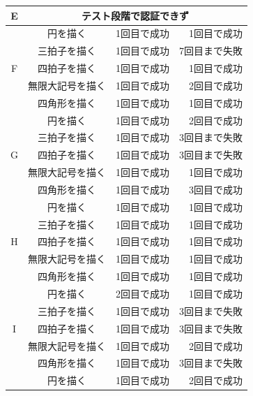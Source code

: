 \documentclass[11pt]{jreport}
\begin{document}
\begin{center}
\begin{longtable}{|c|c|r|r|}
                E & \multicolumn{3}{|c|}{テスト段階で認証できず} \\ \hline
                  & 円を描く & 1回目で成功 & 1回目で成功 \\ \cline{2-4} %
                  & 三拍子を描く & 1回目で成功 & 7回目まで失敗 \\ \cline{2-4}
                F & 四拍子を描く & 1回目で成功 & 1回目で成功 \\ \cline{2-4}
                  & 無限大記号を描く & 1回目で成功 & 2回目で成功 \\ \cline{2-4}
                  & 四角形を描く & 1回目で成功 & 1回目で成功 \\ \hline %
                  & 円を描く & 1回目で成功 & 2回目で成功 \\ \cline{2-4} %
                  & 三拍子を描く & 1回目で成功 & 3回目まで失敗 \\ \cline{2-4}
                G & 四拍子を描く & 1回目で成功 & 3回目まで失敗 \\ \cline{2-4}
                  & 無限大記号を描く & 1回目で成功 & 1回目で成功 \\ \cline{2-4}
                  & 四角形を描く & 1回目で成功 & 3回目で成功 \\ \hline %
                  & 円を描く & 1回目で成功 & 1回目で成功 \\ \cline{2-4} %
                  & 三拍子を描く & 1回目で成功 & 1回目で成功 \\ \cline{2-4}
                H & 四拍子を描く & 1回目で成功 & 1回目で成功 \\ \cline{2-4}
                  & 無限大記号を描く & 1回目で成功 & 1回目で成功 \\ \cline{2-4}
                  & 四角形を描く & 1回目で成功 & 1回目で成功 \\ \hline %
                  & 円を描く & 2回目で成功 & 1回目で成功 \\ \cline{2-4} %
                  & 三拍子を描く & 1回目で成功 & 3回目まで失敗 \\ \cline{2-4}
                I & 四拍子を描く & 1回目で成功 & 3回目まで失敗 \\ \cline{2-4}
                  & 無限大記号を描く & 1回目で成功 & 2回目で成功 \\ \cline{2-4}
                  & 四角形を描く & 1回目で成功 & 3回目まで失敗 \\ \hline %
                  & 円を描く & 1回目で成功 & 2回目で成功 \\ \cline{2-4} %

\end{longtable}
\end{center}
\end{document}
